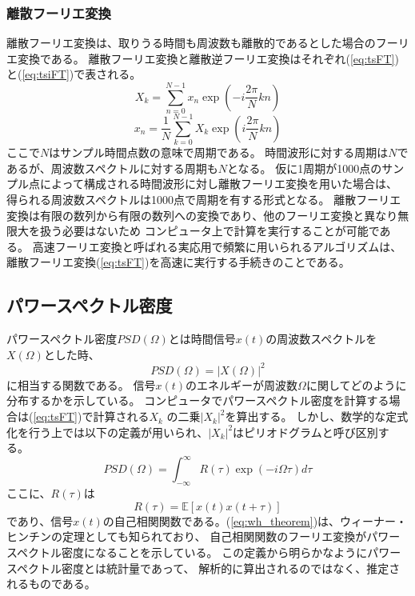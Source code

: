 \subsubsection{\mc 離散フーリエ変換}
離散フーリエ変換は、取りうる時間も周波数も離散的であるとした場合のフーリエ変換である。
離散フーリエ変換と離散逆フーリエ変換はそれぞれ(\ref{eq:tsFT})と(\ref{eq:tsiFT})で表される。
\begin{equation}
    X_k=\sum_{n = 0}^{N-1} x_n \exp \left(-i\frac{2\pi}{N} k n \right)
    \label{eq:tsFT}
\end{equation}
\begin{equation}
    x_n=\frac{1}{N}\sum_{k=0}^{N-1} X_k \exp \left(i \frac{2\pi}{N} k n \right)
    \label{eq:tsiFT}
\end{equation}
ここで\(N\)はサンプル時間点数の意味で周期である。
時間波形に対する周期は\(N\)であるが、周波数スペクトルに対する周期も\(N\)となる。
仮に1周期が1000点のサンプル点によって構成される時間波形に対し離散フーリエ変換を用いた場合は、
得られる周波数スペクトルは1000点で周期を有する形式となる。
離散フーリエ変換は有限の数列から有限の数列への変換であり、他のフーリエ変換と異なり無限大を扱う必要はないため
コンピュータ上で計算を実行することが可能である。
高速フーリエ変換と呼ばれる実応用で頻繁に用いられるアルゴリズムは、
離散フーリエ変換(\ref{eq:tsFT})を高速に実行する手続きのことである。

\subsection{\mc パワースペクトル密度}
パワースペクトル密度\(PSD(\Omega)\)とは時間信号\(x(t)\)の周波数スペクトルを\(X(\Omega)\)とした時、
\begin{equation}
    PSD(\Omega)=|X(\Omega)|^2
    \label{period}
\end{equation}
に相当する関数である。
信号\(x(t)\)のエネルギーが周波数\(\Omega\)に関してどのように分布するかを示している。
コンピュータでパワースペクトル密度を計算する場合は(\ref{eq:tsFT})で計算される\(X_k\)
の二乗\(|X_k|^2\)を算出する。
しかし、数学的な定式化を行う上では以下の定義が用いられ、\(|X_k|^2\)はピリオドグラムと呼び区別する。
\begin{equation}
    PSD(\Omega) = \int_{-\infty}^{\infty} R(\tau)\exp(-i\Omega \tau)d\tau
    \label{eq:wh_theorem}
\end{equation}
ここに、\(R(\tau)\)は
\begin{equation}
    R(\tau)  =  \mathbb E[x(t)x(t+\tau)]    
\end{equation}
であり、信号\(x(t)\)の自己相関関数である。(\ref{eq:wh_theorem})は、ウィーナー・ヒンチンの定理としても知られており、
自己相関関数のフーリエ変換がパワースペクトル密度になることを示している。
この定義から明らかなようにパワースペクトル密度とは統計量であって、
解析的に算出されるのではなく、推定されるものである。

